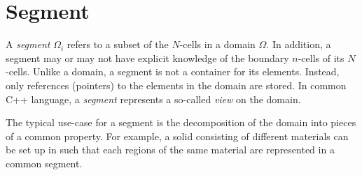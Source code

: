 \section{Segment}
A \emph{segment} $\Omega_i$ refers to a subset of the $N$-cells in a domain $\Omega$. In addition, a segment may or may not have explicit knowledge of the boundary $n$-cells of its $N$-cells. Unlike a domain, a segment is not a container for its elements. Instead, only references (pointers) to the elements in the domain are stored. In common C++ language, a \emph{segment} represents a so-called \emph{view} on the domain.

The typical use-case for a segment is the decomposition of the domain into pieces of a common property. For example, a solid consisting of different materials can be set up in {\ViennaGrid} such that each regions of the same material are represented in a common segment.

